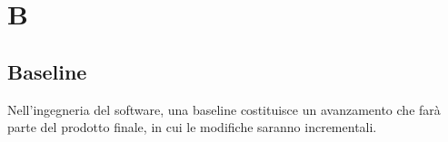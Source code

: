 \section{B}
	\subsection{Baseline}
		Nell'ingegneria del software, una baseline costituisce un avanzamento che farà parte del prodotto finale, in cui le modifiche saranno incrementali.


\newpage